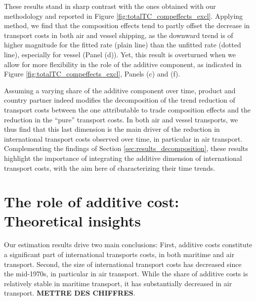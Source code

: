 \documentclass[a4paper,11pt]{article}
\begin{document}
These results stand in sharp contrast with the ones obtained with our methodology and reported in Figure \ref{fig:totalTC_compeffects_excl}.
Applying \cite{hummels2007} method, we find that the composition effects tend to partly offset the decrease in transport costs in both air and vessel shipping, as the downward trend is of higher magnitude for the fitted rate (plain line) than the unfitted rate (dotted line), especially for vessel (Panel (d)).
Yet, this result is overturned when we allow for more flexibility in the role of the additive component, as indicated in Figure \ref{fig:totalTC_compeffects_excl}, Panels (c) and (f).\medskip


Assuming a varying share of the additive component over time, product and country partner indeed modifies the decomposition of the trend reduction of transport costs between the one attributable to trade composition effects and the reduction in the ``pure'' transport costs.
In both air and vessel transports, we thus find that this last dimension is the main driver of the reduction in international transport costs observed over time, in particular in air transport.
Complementing the findings of Section \ref{sec:results_decomposition}, these results highlight the importance of integrating the additive dimension of international transport costs, with the aim here of characterizing their time trends.


\section{The role of additive cost: Theoretical insights}\label{sec:theory}

Our estimation results drive two main conclusions: First, additive costs constitute a significant part of international transports costs, in both maritime and air transport. Second, the size of international transport costs has decreased since the mid-1970s, in particular in air transport. While the share of additive costs is relatively stable in maritime transport, it has substantially decreased in air transport. \textbf{METTRE DES CHIFFRES}.
\end{document}
